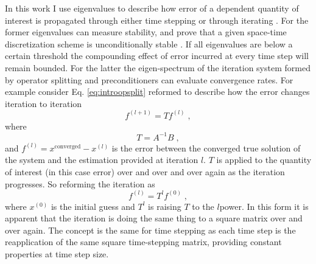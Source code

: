 In this work I use eigenvalues to describe how error of a dependent quantity of interest is propagated through either time stepping \cite{ilham_phd} or through iterating \cite{southworth_phd}.
For the former eigenvalues can measure stability, and prove that a given space-time discretization scheme is {unconditionally stable} \cite{Lax_1956_stability}.
If all eigenvalues are below a certain threshold the compounding effect of error incurred at every time step will remain bounded.
For the latter the eigen-spectrum of the iteration system formed by operator splitting and preconditioners can evaluate convergence rates.
For example consider Eq. \eqref{eq:introopsplit} reformed to describe how the error changes iteration to iteration
\begin{equation}
    f^{(l+1)} = {T}f^{(l)} \; ,
\end{equation}
where
\begin{equation}
    {T} =   A^{-1}B \;,  %
\end{equation}
and $f^{(l)} = x^{\text{converged}} - x^{(l)}$ is the error between the converged true solution of the system and the estimation provided at iteration $l$.
${T}$ is applied to the quantity of interest (in this case error) over and over and over again as the iteration progresses.
So reforming the iteration as
\begin{equation}
    f^{(l)} = {T}^{l}f^{(0)} \; ,
\end{equation}
where $x^{(0)}$ is the initial guess and ${T}^{l}$ is raising ${T}$ to the $l$\ths power.
In this form it is apparent that the iteration is doing the same thing to a square matrix over and over again.
The concept is the same for time stepping as each time step is the reapplication of the same square time-stepping matrix, providing constant properties at time step size.


